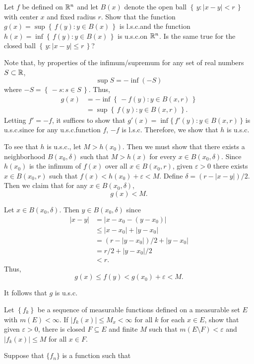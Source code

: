 \begin{problem}
  Let $f$ be defined on $\mathbb{R}^n$ and let $B(x)$ denote the open ball
  $\left\{\,y:|x-y|<r\,\right\}$ with center $x$ and fixed radius $r$. Show
  that the function $g(x)=\sup\left\{\,f(y):y\in B(x)\,\right\}$ is
  l.s.c.\@ and the function $h(x)=\inf\left\{\,f(y):y\in B(x)\,\right\}$ is
  u.s.c.\@ on $\mathbb{R}^n$. Is the same true for the closed ball
  $\left\{\,y:|x-y|\leq r\,\right\}$?
\end{problem}
\begin{solution}
  Note that, by properties of the infimum/supremum for any set of real
  numbers $S\subset\mathbb{R}$,
  \[
    \sup S=-\inf (-S)
  \]
  where $-S=\left\{\,-s:s\in S\,\right\}$. Thus,
  \begin{align*}
    g(x)
    &=-\inf\left\{\,-f(y):y\in B(x,r)\,\right\}\\
    &=\sup\left\{\,f(y):y\in B(x,r)\, \right\}.
  \end{align*}
  Letting $f'=-f$, it suffices to show that $g'(x)=\inf\{\,f'(y):y\in
  B(x,r)\,\}$ is u.s.c.\@ since for any u.s.c.\@ function $f$, $-f$ is
  l.s.c. Therefore, we show that $h$ is u.s.c.

  To see that $h$ is u.s.c., let $M>h(x_0)$. Then we must show that there
  exists a neighborhood $B(x_0,\delta)$ such that $M>h(x)$ for every
  $x\in B(x_0,\delta)$. Since $h(x_0)$ is the infimum of $f(x)$ over all
  $x\in B(x_0,r)$, given $\varepsilon>0$ there exists $x\in B(x_0,r)$ such
  that $f(x)<h(x_0)+\varepsilon<M$. Define $\delta=(r-|x-y|)/2$. Then we
  claim that for any $x\in B(x_0,\delta)$,
  \[
    g(x)<M.
  \]
  \begin{subproof}
    Let $x\in B(x_0,\delta)$. Then $y\in B(x_0,\delta)$ since
    \begin{align*}
      |x-y|&=|x-x_0-(y-x_0)|\\
           &\leq |x-x_0|+|y-x_0|\\
           &=(r-|y-x_0|)/2+|y-x_0|\\
           &=r/2+|y-x_0|/2\\
           &<r.
    \end{align*}
    Thus,
    \[
      g(x)\leq f(y)<g(x_0)+\varepsilon<M.
    \]
  \end{subproof}
  It follows that $g$ is u.s.c.
\end{solution}

\begin{problem}
  Let $\left\{f_k\right\}$ be a sequence of measurable functions defined on
  a measurable set $E$ with $m(E)<\infty$. If $|f_k(x)|\leq M_x<\infty$ for
  all $k$ for each $x\in E$, show that given $\varepsilon>0$, there is
  closed $F\subseteq E$ and finite $M$ such that
  $m(E\setminus F)<\varepsilon$ and $|f_k(x)|\leq M$ for all $x\in F$.
\end{problem}
\begin{solution}
  Suppose that $\{f_n\}$ is a function such that
\end{solution}


